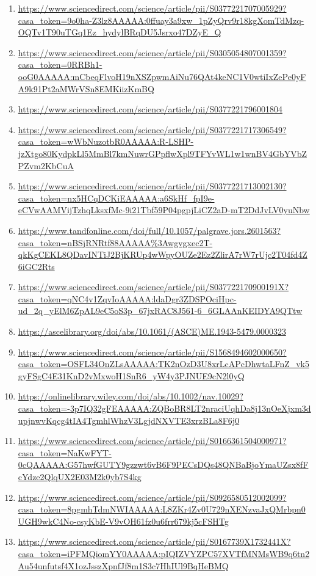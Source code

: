 \documentclass[a4paper,12pt]{article}
\begin{document}
\begin{enumerate}
  \item \url{https://www.sciencedirect.com/science/article/pii/S0377221707005929?casa_token=9o0ha-Z3lz8AAAAA:0ffuay3a9xw_1pZyQrv9r18kgXomTdMzq-OQTv1T90uTGq1Ez_hydylBRqDU5Jsrxo47DZyE_Q}
  \item \url{https://www.sciencedirect.com/science/article/pii/S0305054807001359?casa_token=0RRBh1-ooG0AAAAA:mCbeqFlvoH19nXSZpwmAiNu76QAt4keNC1V0wtiIxZePe0yFA9k91Pt2aMWrVSn8EMKiizKmBQ}
  \item \url{https://www.sciencedirect.com/science/article/pii/S0377221796001804}
  \item \url{https://www.sciencedirect.com/science/article/pii/S0377221717306549?casa_token=wWbNuzotbR0AAAAA:R-LSHP-jzXtgo80KydpkLl5MmBl7kmNuwrGPpflwXpl9TFYvWL1w1wnBV4GbYVbZPZvm2KbCuA}
  \item \url{https://www.sciencedirect.com/science/article/pii/S0377221713002130?casa_token=nx5HCqDCKiEAAAAA:a6SkHf_fpI9e-eCVwAAMVijTzhqLksxfMc-9i21Tbf59P04pgpjLiCZ2aD-mT2DdJvLV0yuNbw}
  \item \url{https://www.tandfonline.com/doi/full/10.1057/palgrave.jors.2601563?casa_token=nBSjRNRtf88AAAAA%3Awgvgxec2T-qkKgCEKL8QDavINTiJ2BjKRUp4wWpyOUZe2Ez2ZlirA7rW7rUjc2T04fd4Z6iGC2Rts}
  \item \url{https://www.sciencedirect.com/science/article/pii/S037722170900191X?casa_token=qNC4v1ZqvIoAAAAA:ldaDgr3ZDSPOciHpc-ud_2q_yElM6ZpAL9eC5oS3p_67jxRAC8J561-6_6GLAAnKEIDYA9QTtw}
  \item \url{https://ascelibrary.org/doi/abs/10.1061/(ASCE)ME.1943-5479.0000323}
  \item \url{https://www.sciencedirect.com/science/article/pii/S1568494602000650?casa_token=OSFL34OnZLsAAAAA:TK2nOzD3U8xrLcAPcDhwtaLFnZ_vk5gyFSgC4E31KnD2vMxwoH1SnR6_yW4y3PJNUE9cN2l0yQ}
  \item \url{https://onlinelibrary.wiley.com/doi/abs/10.1002/nav.10029?casa_token=-3p7IQ32gFEAAAAA:ZQBoBR8LT2nraciUqhDa8j13nOeXjxm3dupjnwvKqcg4tIA4TgmhlWhzV3LgjdNXVTE3xrzBLa8F6j0}
  \item \url{https://www.sciencedirect.com/science/article/pii/S0166361504000971?casa_token=NaKwFYT-0cQAAAAA:G57hwfGUTY9gzzwt6vB6F9PECsDQs48QNBaBjoYmaUZsx8fFcYdze2QlqUX2E03M2k0yb7S4kg}
  \item \url{https://www.sciencedirect.com/science/article/pii/S0926580512002099?casa_token=8pgmhTdmNWIAAAAA:L8ZKr4Zv0U729nXENzvaJxQMrbpn0UGH9wkC4No-csyKbE-V9vOH61fz0u6frr679kj5cFSHTg}
  \item \url{https://www.sciencedirect.com/science/article/pii/S0167739X1732441X?casa_token=iPFMQiomYY0AAAAA:pIQIZVYZPC57XVTfMNMsWB9q6tn2Au54unfutsf4X1ozJsszXpnfJf8m1S3c7HhIUl9BqHeBMQ}

\end{enumerate}
\end{document}
